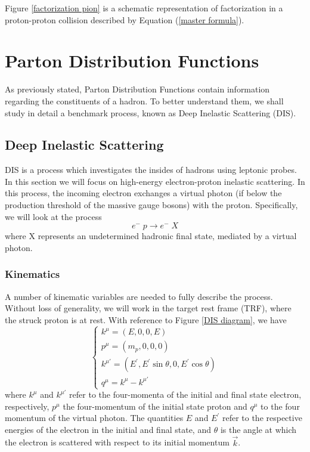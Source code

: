 \documentclass[10pt,a4paper]{book}
\begin{document}
Figure \ref{factorization pion} is a schematic representation of factorization in a proton-proton collision described by Equation (\ref{master formula}).

\section{Parton Distribution Functions}

As previously stated, Parton Distribution Functions contain information regarding the constituents of a hadron. To better understand them, we shall study in detail a benchmark process, known as Deep Inelastic Scattering (DIS).

\subsection{Deep Inelastic Scattering}

DIS is a process which investigates the insides of hadrons using leptonic probes. In this section we will focus on high-energy electron-proton inelastic scattering. In this process, the incoming electron exchanges a virtual photon (if below the production threshold of the massive gauge bosons) with the proton. Specifically, we will look at the process
\begin{equation}
e^- \; p \rightarrow e^- \; X
\end{equation}
where X represents an undetermined hadronic final state, mediated by a virtual photon. 

\subsubsection{Kinematics} 
A number of kinematic variables are needed to fully describe the process. Without loss of generality, we will work in the target rest frame (TRF), where the struck proton is at rest. With reference to Figure \ref{DIS diagram}, we have
\begin{equation}
\begin{cases}
k^\mu = (E, 0, 0, E)  \\
p^\mu = (m_p, 0, 0, 0) \\
k^{\mu\prime} = (E^\prime, E^\prime \sin\theta, 0, E^\prime \cos\theta) \\
q^\mu = k^\mu - k^{\mu\prime}
\end{cases}
\label{kinematics}
\end{equation}
where $k^\mu$ and $k^{\mu\prime}$ refer to the four-momenta of the initial and final state electron, respectively, $p^\mu$ the four-momentum of the initial state proton and $q^\mu$ to the four momentum of the virtual photon. The quantities $E$ and $E^\prime$ refer to the respective energies of the electron in the initial and final state, and $\theta$ is the angle at which the electron is scattered with respect to its initial momentum $\vec{k}$. 
\end{document}
